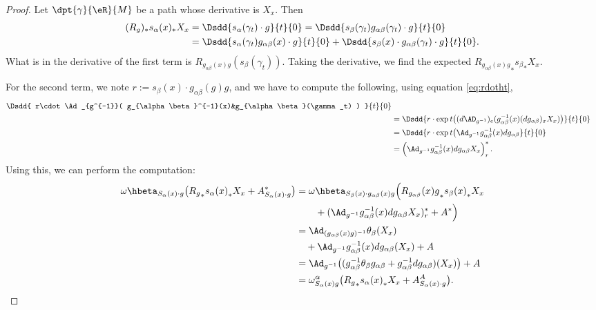 \begin{proof}
Let $\dpt{\gamma}{\eR}{M}$ be a path whose derivative is $X_x$. Then
\begin{equation}
\begin{split}
   (R_g)_*s_{\alpha}(x)_*X_x&=\Dsdd{s_{\alpha}(\gamma_t)\cdot g}{t}{0}
                          =\Dsdd{  s_{\beta}(\gamma_t)g_{\alpha\beta}(\gamma_t)\cdot g  }{t}{0}\\
                          &=\Dsdd{ s_{\alpha}(\gamma_t)g_{\alpha\beta}(x)\cdot g }{t}{0}
                          +\Dsdd{ s_{\beta}(x)\cdot g_{\alpha\beta}(\gamma_t)\cdot g }{t}{0}.
\end{split}
\end{equation}
What is in the derivative of the first term is $R_{g_{\alpha\beta}(x)g}(s_{\beta}(\gamma_t))$. Taking the derivative, we find the expected ${R_{g_{\alpha\beta}(x)g}}_*{s_{\beta}}_*X_x$.

For the second term, we note $r:=s_{\beta}(x)\cdot g_{\alpha\beta}(g)g$, and we have to compute the following, using equation \eqref{eq:rdotht},
\begin{equation}
\begin{aligned}
 \Dsdd{  r\cdot\Ad_{g^{-1}}( g_{\alpha\beta}^{-1}(x)&g_{\alpha\beta}(\gamma_t) ) }{t}{0}\\
                  &=\Dsdd{ r\cdot\exp t\big(    (d\AD_{g^{-1}})_e( g_{\alpha\beta}^{-1}(x)(dg_{\alpha\beta})_xX_x )   \big)}{t}{0}\\
                  &=\Dsdd{r\cdot\exp t\big( \Ad_{g^{-1}}g_{\alpha\beta}^{-1}(x)dg_{\alpha\beta}}{t}{0}\\
                  &=\left(  \Ad_{g^{-1}}g^{-1}_{\alpha\beta}(x)dg_{\alpha\beta} X_x    \right)^*_r.
\end{aligned}
\end{equation}
Using this, we can perform the computation:
\begin{equation}
\begin{aligned}
\omega\hbeta_{S_{\alpha}(x)\cdot g}\big(  {R_g}_*{s_{\alpha}(x)}_*X_x+A^*_{S_{\alpha}(x)\cdot g}  \big)
                          &=\omega\hbeta_{S_{\beta}(x)\cdot g_{\alpha\beta}(x)g}\Big(  {R_{g_{\alpha\beta}}(x)g}_*{s_{\beta}(x)}_*X_x \\
                              &\qquad + (  \Ad_{g^{-1}}g^{-1}_{\alpha\beta}(x)dg_{\alpha\beta} X_x  )^*_r +A^* \Big)\\
                          &=\Ad_{(g_{\alpha\beta}(x)g)^{-1}}\theta_{\beta}(X_x)\\
			&\quad+\Ad_{g^{-1}}g_{\alpha\beta}^{-1}(x)dg_{\alpha\beta}(X_x)+A\\
                          &=\Ad_{g^{-1}}\big(  (g_{\alpha\beta}^{-1}\theta_{\beta} g_{\alpha\beta}+g_{\alpha\beta}^{-1} dg_{\alpha\beta})(X_x)  \big)+A\\
                          &=\omega^{\alpha}_{S_{\alpha}(x)g}\big( {R_g}_*{s_{\alpha}(x)}_*X_x+A^A_{S_{\alpha}(x)\cdot g} \big).
\end{aligned}
\end{equation}

\end{proof}

